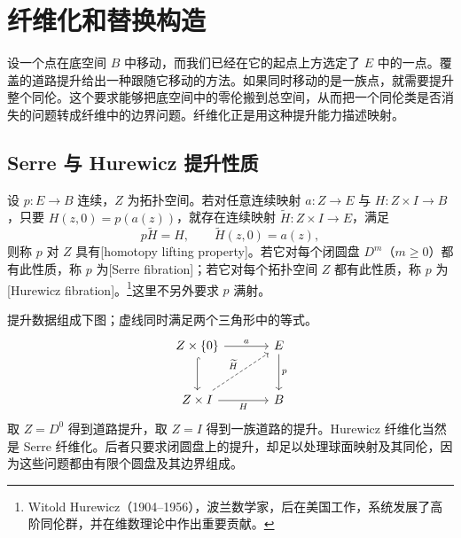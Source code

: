 
% 
% 

\section{纤维化和替换构造}
\label{g2:sec:0802}

设一个点在底空间 \(B\) 中移动，而我们已经在它的起点上方选定了 \(E\) 中的一点。覆盖的道路提升给出一种跟随它移动的方法。如果同时移动的是一族点，就需要提升整个同伦。这个要求能够把底空间中的零伦搬到总空间，从而把一个同伦类是否消失的问题转成纤维中的边界问题。纤维化正是用这种提升能力描述映射。

\subsection{Serre 与 Hurewicz 提升性质}
\label{g2:subsec:0802:01}

\begin{definition}[同伦提升与纤维化]\label{g2:def:serre-fibration}
	设 \(p:E\rightarrow B\) 连续，\(Z\) 为拓扑空间。若对任意连续映射 \(a:Z\rightarrow E\) 与 \(H:Z\times I\rightarrow B\)，只要 \(H(z,0)=p(a(z))\)，就存在连续映射 \(\widetilde H:Z\times I\rightarrow E\)，满足
	\[
		p\widetilde H=H,\qquad \widetilde H(z,0)=a(z),
	\]
	则称 \(p\) 对 \(Z\) 具有[homotopy lifting property]。若它对每个闭圆盘 \(D^m\)（\(m\ge0\)）都有此性质，称 \(p\) 为[Serre fibration]；若它对每个拓扑空间 \(Z\) 都有此性质，称 \(p\) 为[Hurewicz fibration]。\footnote{Witold Hurewicz（1904--1956），波兰数学家，后在美国工作，系统发展了高阶同伦群，并在维数理论中作出重要贡献。}这里不另外要求 \(p\) 满射。
\end{definition}

提升数据组成下图；虚线同时满足两个三角形中的等式。
\[
	\begin{tikzcd}[column sep=large,row sep=large]
		Z\times\{0\} \arrow[r,"a"] \arrow[d,hook] & E \arrow[d,"p"] \\
		Z\times I \arrow[r,"H"'] \arrow[ur,dashed,"\widetilde H"] & B
	\end{tikzcd}
\]
取 \(Z=D^0\) 得到道路提升，取 \(Z=I\) 得到一族道路的提升。Hurewicz 纤维化当然是 Serre 纤维化。后者只要求闭圆盘上的提升，却足以处理球面映射及其同伦，因为这些问题都由有限个圆盘及其边界组成。

